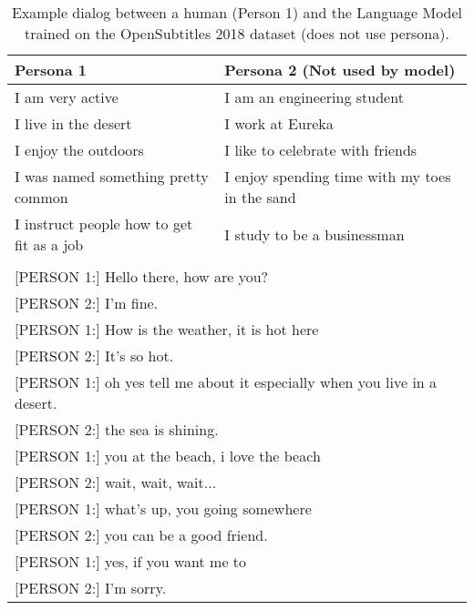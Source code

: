 \documentclass[11pt,a4paper]{article}
\begin{document}
\begin{table*}[t]
  \begin{center}
    \begin{small}
      \begin{tabular}{l|l}
        \toprule
        \textbf{Persona 1} & \textbf{Persona 2 (Not used by model)}\\
     \midrule   
I am very active & I am an engineering student \\ 
I live in the desert & I work at Eureka \\
I enjoy the outdoors & I like to celebrate with friends  \\
I was named something pretty common & I enjoy spending time with my toes in the sand\\
I instruct people how to get fit as a job &  I study to be a businessman \\
\bottomrule
\multicolumn{2}{l}{ }\\
\multicolumn{2}{l}{[PERSON 1:] Hello there, how are you?}\\
\multicolumn{2}{l}{[PERSON 2:] I'm fine.}\\
\multicolumn{2}{l}{[PERSON 1:] How is the weather, it is hot here }\\
\multicolumn{2}{l}{[PERSON 2:] It's so hot.}\\
\multicolumn{2}{l}{[PERSON 1:] oh yes tell me about it especially when you live in a desert.}\\
\multicolumn{2}{l}{[PERSON 2:] the sea is shining.}\\
\multicolumn{2}{l}{[PERSON 1:] you at the beach, i love the beach}\\
\multicolumn{2}{l}{[PERSON 2:] wait, wait, wait...}\\
\multicolumn{2}{l}{[PERSON 1:] what's up, you going somewhere }\\
\multicolumn{2}{l}{[PERSON 2:] you can be a good friend.}\\
\multicolumn{2}{l}{[PERSON 1:] yes, if you want me to}\\
\multicolumn{2}{l}{[PERSON 2:] I'm sorry.}\\
      \end{tabular}
      \caption{Example dialog between a human (Person 1) and the Language Model trained on the OpenSubtitles 2018 dataset (does not use persona). \label{table:opensubtitles2018-example}}
    \end{small}
  \end{center}
\end{table*}
\end{document}
